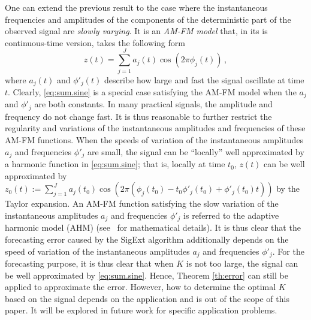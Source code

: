 One can extend the previous result to the case where the instantaneous frequencies and amplitudes of the components of the deterministic part of the observed signal are {\em slowly varying}. It is an \textit{AM-FM model} that, in its is continuous-time version, takes the following form
\begin{equation}
z(t) = \sum_{j=1}^J a_j(t)\cos(2\pi\phi_j(t))\,,
\end{equation}
where $a_j(t)$ and $\phi'_j(t)$ describe how large and fast the signal oscillate at time $t$. 
Clearly, \eqref{eq:sum.sine} is a special case satisfying the AM-FM model when the $a_j$ and $\phi'_j$ are both constants. 
%
In many practical signals, the amplitude and frequency do not change fast. It is thus reasonable to further restrict the regularity and variations of the instantaneous amplitudes and frequencies of these AM-FM functions. When the speeds of variation of the instantaneous amplitudes $a_j$ and frequencies $\phi'_j$ are small, the signal can be ``locally'' well approximated by a harmonic function in \eqref{eq:sum.sine}; that is, 
%
locally at time $t_0$, $z(t)$ can be well approximated by $z_0(t) := \sum_{j=1}^J a_j(t_0)\cos(2\pi(\phi_j(t_0)-t_0\phi'_j(t_0)+\phi'_j(t_0)t))$ by the Taylor expansion. An AM-FM function satisfying the slow variation of the instantaneous amplitudes $a_j$ and frequencies $\phi'_j$ is referred to the adaptive harmonic model (AHM) (see~\cite{Chen14nonparametric,Daubechies16conceft} for mathematical details).
It is thus clear that the forecasting error caused by the {\sf SigExt} algorithm additionally depends on the speed of variation of the instantaneous amplitudes $a_j$ and frequencies $\phi'_j$. 
%
For the forecasting purpose, it is thus clear that when $K$ is not too large, the signal can be well approximated by \eqref{eq:sum.sine}. Hence, Theorem \ref{th:error} can still be applied to approximate the error. However, how to determine the optimal $K$ based on the signal depends on the application and is out of the scope of this paper. It will be explored in future work for specific application problems.



